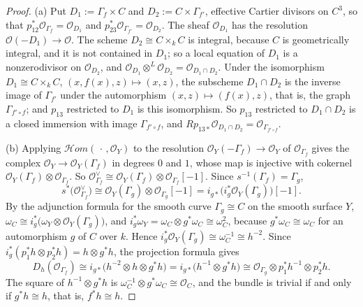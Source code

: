 \documentclass[11pt]{amsart}
\theoremstyle{definition}
\theoremstyle{remark}
\begin{document}
\begin{proof}
(a)  Put $D_1:=\Gamma_f\times C$ and $D_2:=C\times\Gamma_{f'}$, effective
Cartier divisors on $C^{3}$, so that
$p_{12}^{*}\mathcal O_{\Gamma_f}=\mathcal O_{D_1}$ and
$p_{23}^{*}\mathcal O_{\Gamma_{f'}}=\mathcal O_{D_2}$.  The sheaf
$\mathcal O_{D_1}$ has the resolution
$\mathcal O(-D_1)\to\mathcal O$.  The scheme $D_2\cong C\times_kC$ is
integral, because $C$ is geometrically integral, and it is not contained in
$D_1$; so a local equation of $D_1$ is a nonzerodivisor on
$\mathcal O_{D_2}$, and
$\mathcal O_{D_1}\otimes^{L}\mathcal O_{D_2}=\mathcal O_{D_1\cap D_2}$.  Under
the isomorphism $D_1\cong C\times_kC$, $(x,f(x),z)\mapsto(x,z)$, the subscheme
$D_1\cap D_2$ is the inverse image of $\Gamma_{f'}$ under the automorphism
$(x,z)\mapsto(f(x),z)$, that is, the graph $\Gamma_{f'\circ f}$; and $p_{13}$
restricted to $D_1$ is this isomorphism.  So $p_{13}$ restricted to
$D_1\cap D_2$ is a closed immersion with image $\Gamma_{f'\circ f}$, and
$Rp_{13*}\mathcal O_{D_1\cap D_2}=\mathcal O_{\Gamma_{f'\circ f}}$.

(b)  Applying $\mathcal{H}om(\,\cdot\,,\mathcal O_Y)$ to the resolution
$\mathcal O_Y(-\Gamma_f)\to\mathcal O_Y$ of $\mathcal O_{\Gamma_f}$ gives the
complex $\mathcal O_Y\to\mathcal O_Y(\Gamma_f)$ in degrees $0$ and $1$, whose
map is injective with cokernel
$\mathcal O_Y(\Gamma_f)\otimes\mathcal O_{\Gamma_f}$.  So
$\mathcal O_{\Gamma_f}^{\vee}\cong\mathcal O_Y(\Gamma_f)\otimes
\mathcal O_{\Gamma_f}[-1]$.  Since $s^{-1}(\Gamma_f)=\Gamma_g$,
\[
s^{*}\bigl(\mathcal O_{\Gamma_f}^{\vee}\bigr)\cong
\mathcal O_Y(\Gamma_g)\otimes\mathcal O_{\Gamma_g}[-1]
=i_{g*}\bigl(i_g^{*}\mathcal O_Y(\Gamma_g)\bigr)[-1].
\]
By the adjunction formula for the smooth curve $\Gamma_g\cong C$ on the
smooth surface $Y$,
$\omega_C\cong i_g^{*}\bigl(\omega_Y\otimes\mathcal O_Y(\Gamma_g)\bigr)$, and
$i_g^{*}\omega_Y=\omega_C\otimes g^{*}\omega_C\cong\omega_C^{2}$, because
$g^{*}\omega_C\cong\omega_C$ for an automorphism $g$ of $C$ over $k$.  Hence
$i_g^{*}\mathcal O_Y(\Gamma_g)\cong\omega_C^{-1}\cong h^{-2}$.  Since
$i_g^{*}(p_1^{*}h\otimes p_2^{*}h)=h\otimes g^{*}h$, the projection formula
gives
\[
D_h(\mathcal O_{\Gamma_f})\cong
i_{g*}\bigl(h^{-2}\otimes h\otimes g^{*}h\bigr)
=i_{g*}\bigl(h^{-1}\otimes g^{*}h\bigr)
\cong\mathcal O_{\Gamma_g}\otimes p_1^{*}h^{-1}\otimes p_2^{*}h .
\]
The square of $h^{-1}\otimes g^{*}h$ is
$\omega_C^{-1}\otimes g^{*}\omega_C\cong\mathcal O_C$, and the bundle is
trivial if and only if $g^{*}h\cong h$, that is, $f^{*}h\cong h$.
\end{proof}
\end{document}
